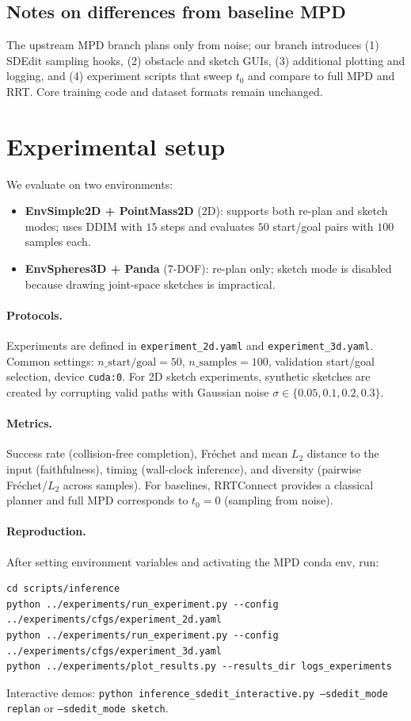 \documentclass[12pt]{article}
\begin{document}
\subsection{Notes on differences from baseline MPD}
The upstream MPD branch plans only from noise; our branch introduces (1) SDEdit sampling hooks, (2) obstacle and sketch GUIs, (3) additional plotting and logging, and (4) experiment scripts that sweep $t_{0}$ and compare to full MPD and RRT. Core training code and dataset formats remain unchanged.

\section{Experimental setup}
We evaluate on two environments:
\begin{itemize}[leftmargin=*]
  \item \textbf{EnvSimple2D + PointMass2D} (2D): supports both re-plan and sketch modes; uses DDIM with $15$ steps and evaluates $50$ start/goal pairs with $100$ samples each.
  \item \textbf{EnvSpheres3D + Panda} (7-DOF): re-plan only; sketch mode is disabled because drawing joint-space sketches is impractical.
\end{itemize}

\paragraph{Protocols.} Experiments are defined in \texttt{experiment\_2d.yaml} and \texttt{experiment\_3d.yaml}. Common settings: $n\_{\text{start/goal}}{=}50$, $n\_{\text{samples}}{=}100$, validation start/goal selection, device \texttt{cuda:0}. For 2D sketch experiments, synthetic sketches are created by corrupting valid paths with Gaussian noise $\sigma\in\{0.05,0.1,0.2,0.3\}$.

\paragraph{Metrics.} Success rate (collision-free completion), Fréchet and mean $L_{2}$ distance to the input (faithfulness), timing (wall-clock inference), and diversity (pairwise Fréchet/$L_{2}$ across samples). For baselines, RRTConnect provides a classical planner and full MPD corresponds to $t_{0}{=}0$ (sampling from noise).

\paragraph{Reproduction.} After setting environment variables and activating the MPD conda env, run:
\begin{verbatim}
cd scripts/inference
python ../experiments/run_experiment.py --config ../experiments/cfgs/experiment_2d.yaml
python ../experiments/run_experiment.py --config ../experiments/cfgs/experiment_3d.yaml
python ../experiments/plot_results.py --results_dir logs_experiments
\end{verbatim}
Interactive demos: \texttt{python inference\_sdedit\_interactive.py --sdedit\_mode replan} or \texttt{--sdedit\_mode sketch}.
\end{document}
